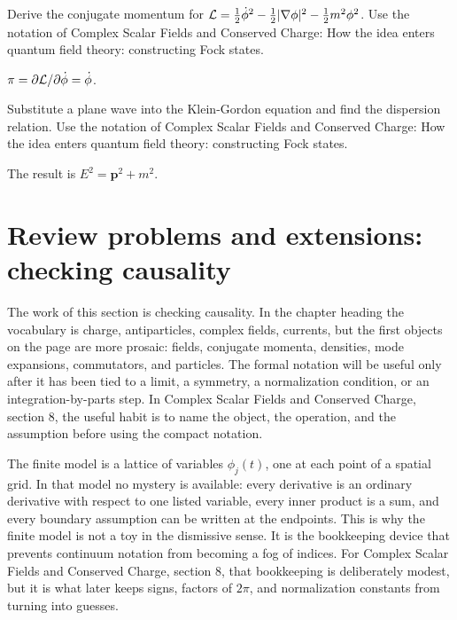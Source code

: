 \begin{exercise}
Derive the conjugate momentum for \(\mathcal L=\frac12\dot\phi^2-\frac12|\nabla\phi|^2-\frac12m^2\phi^2\).  Use the notation of Complex Scalar Fields and Conserved Charge: How the idea enters quantum field theory: constructing Fock states.
\begin{answer}
\(\pi=\partial\mathcal L/\partial\dot\phi=\dot\phi\).
\end{answer}
\end{exercise}

\begin{exercise}
Substitute a plane wave into the Klein-Gordon equation and find the dispersion relation.  Use the notation of Complex Scalar Fields and Conserved Charge: How the idea enters quantum field theory: constructing Fock states.
\begin{answer}
The result is \(E^2=\bm p^2+m^2\).
\end{answer}
\end{exercise}



\section{Review problems and extensions: checking causality}

The work of this section is checking causality.  In the chapter heading the vocabulary is charge, antiparticles, complex fields, currents, but the first objects on the page are more prosaic: fields, conjugate momenta, densities, mode expansions, commutators, and particles.  The formal notation will be useful only after it has been tied to a limit, a symmetry, a normalization condition, or an integration-by-parts step.  In Complex Scalar Fields and Conserved Charge, section 8, the useful habit is to name the object, the operation, and the assumption before using the compact notation.

The finite model is a lattice of variables \(\phi_j(t)\), one at each point of a spatial grid.  In that model no mystery is available: every derivative is an ordinary derivative with respect to one listed variable, every inner product is a sum, and every boundary assumption can be written at the endpoints.  This is why the finite model is not a toy in the dismissive sense.  It is the bookkeeping device that prevents continuum notation from becoming a fog of indices.  For Complex Scalar Fields and Conserved Charge, section 8, that bookkeeping is deliberately modest, but it is what later keeps signs, factors of \(2\pi\), and normalization constants from turning into guesses.

